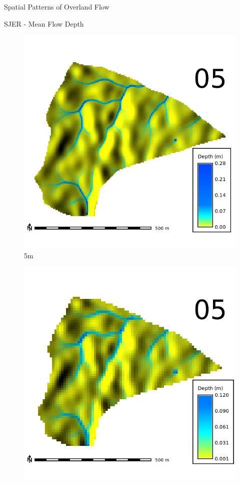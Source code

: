 \documentclass[
  ignorenonframetext,
]{beamer}
\begin{document}
\begin{frame}{Spatial Patterns of Overland Flow}
\begin{block}{SJER - Mean Flow Depth}
\begin{figure}[H]
{\centering \includegraphics{../output/SJER/sensitivity_1/SJER_depth_5_4_s_average.webp}

}

\caption{5m}

\end{figure}%

\begin{figure}[H]

{\centering \includegraphics{../output/SJER/sensitivity_1/SJER_depth_10_4_s_average.webp}

}
\end{figure}
\end{block}
\end{frame}
\end{document}
